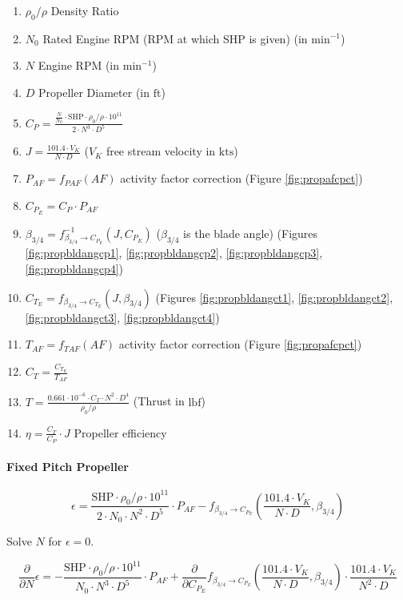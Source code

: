 \documentclass[a4paper,10pt,pdftex]{article}
\begin{document}
\begin{enumerate}
\item $\rho_0/\rho$ Density Ratio
\item $N_0$ Rated Engine RPM (RPM at which SHP is given) (in $\mathrm{min}^{-1}$)
\item $N$ Engine RPM (in $\mathrm{min}^{-1}$)
\item $D$ Propeller Diameter (in $\mathrm{ft}$)
\item $C_P=\frac{\frac{N}{N_0}\cdot\mathrm{SHP}\cdot\rho_0/\rho\cdot{}10^{11}}{2\cdot{}N^3\cdot{}D^5}$
\item $J=\frac{101.4\cdot{}V_K}{N\cdot{}D}$ ($V_K$ free stream velocity in $\mathrm{kts}$)
\item $P_{AF}=f_{PAF}(AF)$ activity factor correction (Figure \ref{fig:propafcpct})
\item $C_{P_E}=C_P\cdot{}P_{AF}$
\item $\beta_{3/4}=f^{-1}_{\beta_{3/4}\rightarrow{}C_{P_E}}(J,C_{P_E})$ ($\beta_{3/4}$ is the blade angle)
  (Figures \ref{fig:propbldangcp1}, \ref{fig:propbldangcp2}, \ref{fig:propbldangcp3}, \ref{fig:propbldangcp4})
\item $C_{T_E}=f_{\beta_{3/4}\rightarrow{}C_{T_E}}(J,\beta_{3/4})$
  (Figures \ref{fig:propbldangct1}, \ref{fig:propbldangct2}, \ref{fig:propbldangct3}, \ref{fig:propbldangct4})
\item $T_{AF}=f_{TAF}(AF)$ activity factor correction (Figure \ref{fig:propafcpct})
\item $C_T=\frac{C_{T_E}}{T_{AF}}$
\item $T=\frac{0.661\cdot{}10^{-6}\cdot{}C_T\cdot{}N^2\cdot{}D^4}{\rho_0/\rho}$ (Thrust in $\mathrm{lbf}$)
\item $\eta=\frac{C_T}{C_P}\cdot{}J$ Propeller efficiency
\end{enumerate}

\paragraph{Fixed Pitch Propeller}

\begin{equation}
  \epsilon=\frac{\mathrm{SHP}\cdot\rho_0/\rho\cdot{}10^{11}}{2\cdot{}N_0\cdot{}N^2\cdot{}D^5}\cdot{}P_{AF}
  -f_{\beta_{3/4}\rightarrow{}C_{P_E}}\left(\frac{101.4\cdot{}V_K}{N\cdot{}D},\beta_{3/4}\right)
\end{equation}

Solve $N$ for $\epsilon=0$.

\begin{equation}
  \frac{\partial}{\partial{}N}\epsilon=-\frac{\mathrm{SHP}\cdot\rho_0/\rho\cdot{}10^{11}}{N_0\cdot{}N^3\cdot{}D^5}\cdot{}P_{AF}
  +\frac{\partial}{\partial{}C_{P_E}}f_{\beta_{3/4}\rightarrow{}C_{P_E}}\left(\frac{101.4\cdot{}V_K}{N\cdot{}D},\beta_{3/4}\right)\cdot{}\frac{101.4\cdot{}V_K}{N^2\cdot{}D}
\end{equation}
\end{document}
